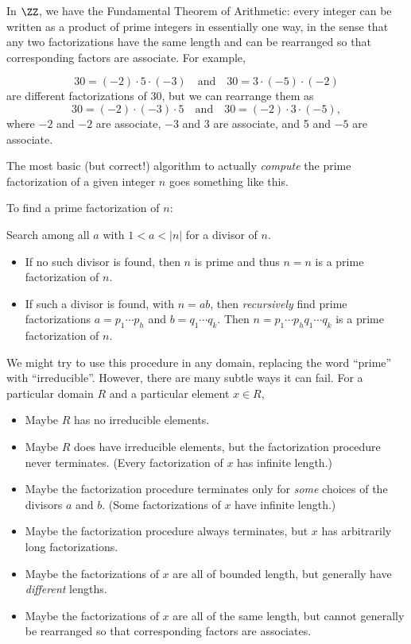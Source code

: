\documentclass{article}
\begin{document}

In $\ZZ$, we have the Fundamental Theorem of Arithmetic: every integer can be written as a product of prime integers in essentially one way, in the sense that any two factorizations have the same length and can be rearranged so that corresponding factors are associate. For example,

\[ 30 = (-2) \cdot 5 \cdot (-3) \quad \mathrm{and} \quad 30 = 3 \cdot (-5) \cdot (-2) \] are different factorizations of 30, but we can rearrange them as \[ 30 = (-2) \cdot (-3) \cdot 5 \quad \mathrm{and} \quad 30 = (-2) \cdot 3 \cdot (-5), \] where $-2$ and $-2$ are associate, $-3$ and 3 are associate, and 5 and $-5$ are associate.

The most basic (but correct!) algorithm to actually \emph{compute} the prime factorization of a given integer $n$ goes something like this.

\begin{framed}
\noindent To find a prime factorization of $n$:

Search among all $a$ with $1 < a < |n|$ for a divisor of $n$.
\begin{itemize}
\item If no such divisor is found, then $n$ is prime and thus $n = n$ is a prime factorization of $n$.
\item If such a divisor is found, with $n = ab$, then \emph{recursively} find prime factorizations $a = p_1 \cdots p_h$ and $b = q_1 \cdots q_k$. Then $n = p_1 \cdots p_h q_1 \cdots q_k$ is a prime factorization of $n$.
\end{itemize}
\end{framed}

We might try to use this procedure in any domain, replacing the word ``prime'' with ``irreducible''. However, there are many subtle ways it can fail. For a particular domain $R$ and a particular element $x \in R$,
\begin{itemize}
\item Maybe $R$ has no irreducible elements.
\item Maybe $R$ does have irreducible elements, but the factorization procedure never terminates. (Every factorization of $x$ has infinite length.)
\item Maybe the factorization procedure terminates only for \emph{some} choices of the divisors $a$ and $b$. (Some factorizations of $x$ have infinite length.)
\item Maybe the factorization procedure always terminates, but $x$ has arbitrarily long factorizations.
\item Maybe the factorizations of $x$ are all of bounded length, but generally have \emph{different} lengths.
\item Maybe the factorizations of $x$ are all of the same length, but cannot generally be rearranged so that corresponding factors are associates.
\end{itemize}
\end{document}
